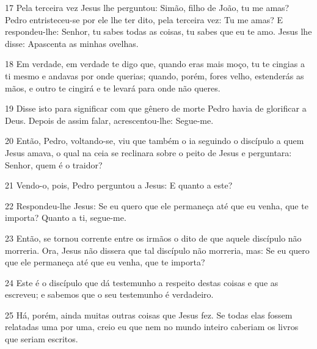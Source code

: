 \par 17 Pela terceira vez Jesus lhe perguntou: Simão, filho de João, tu me amas? Pedro entristeceu-se por ele lhe ter dito, pela terceira vez: Tu me amas? E respondeu-lhe: Senhor, tu sabes todas as coisas, tu sabes que eu te amo. Jesus lhe disse: Apascenta as minhas ovelhas.
\par 18 Em verdade, em verdade te digo que, quando eras mais moço, tu te cingias a ti mesmo e andavas por onde querias; quando, porém, fores velho, estenderás as mãos, e outro te cingirá e te levará para onde não queres.
\par 19 Disse isto para significar com que gênero de morte Pedro havia de glorificar a Deus. Depois de assim falar, acrescentou-lhe: Segue-me.
\par 20 Então, Pedro, voltando-se, viu que também o ia seguindo o discípulo a quem Jesus amava, o qual na ceia se reclinara sobre o peito de Jesus e perguntara: Senhor, quem é o traidor?
\par 21 Vendo-o, pois, Pedro perguntou a Jesus: E quanto a este?
\par 22 Respondeu-lhe Jesus: Se eu quero que ele permaneça até que eu venha, que te importa? Quanto a ti, segue-me.
\par 23 Então, se tornou corrente entre os irmãos o dito de que aquele discípulo não morreria. Ora, Jesus não dissera que tal discípulo não morreria, mas: Se eu quero que ele permaneça até que eu venha, que te importa?
\par 24 Este é o discípulo que dá testemunho a respeito destas coisas e que as escreveu; e sabemos que o seu testemunho é verdadeiro.
\par 25 Há, porém, ainda muitas outras coisas que Jesus fez. Se todas elas fossem relatadas uma por uma, creio eu que nem no mundo inteiro caberiam os livros que seriam escritos.


